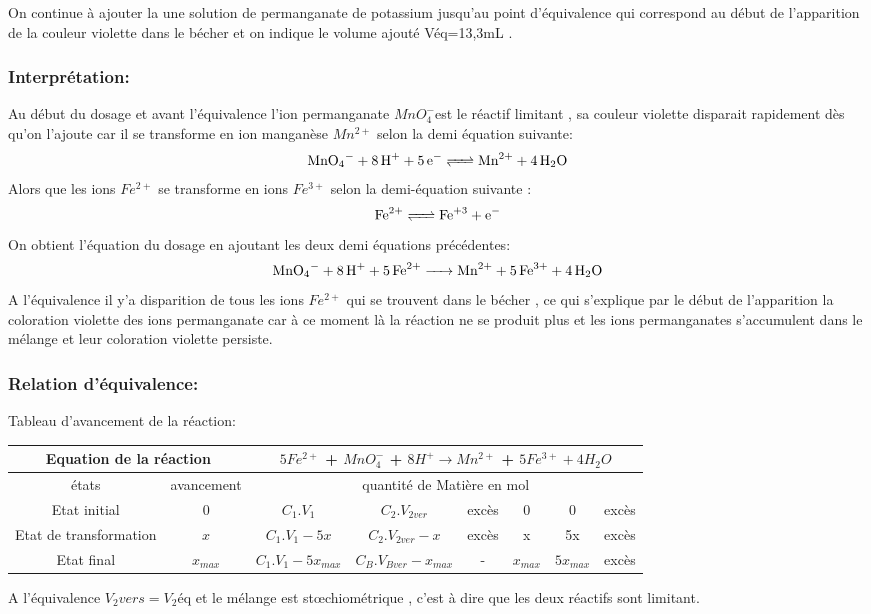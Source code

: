 \documentclass[12pt]{article}
\begin{document}
On continue à ajouter la une solution de permanganate de potassium jusqu'au point d'équivalence qui correspond au
début de l'apparition de la couleur violette dans le bécher et on indique le volume ajouté Véq=13,3mL .

\subsubsection{Interprétation:}
Au début du dosage et avant l'équivalence l'ion permanganate $MnO_4^-$est le réactif limitant , sa couleur violette
disparait rapidement dès qu'on l'ajoute car il se transforme en ion manganèse $Mn^{2+}$ selon la demi équation suivante:
$$\ce{MnO_4^- + 8H^+ + 5e^- <=> Mn^{2+} + 4H_2O}$$
Alors que les ions $Fe^{2+}$ se transforme en ions $Fe^{3+}$ selon la demi-équation suivante : $$\ce{Fe^{2+} <=> Fe^{+3} + e^-}$$
On obtient l'équation du dosage en ajoutant les deux demi équations précédentes:
$$\ce{MnO_4^- + 8H^+ + 5Fe^{2+} -> Mn^{2+} +5Fe^{3+} + 4H_2O}$$
A l'équivalence il y'a disparition de tous les ions $Fe^{2+}$ qui se trouvent dans le bécher , ce qui s'explique par le début de
l'apparition la coloration violette des ions permanganate car à ce moment là la réaction ne se produit plus et les ions
permanganates s'accumulent dans le mélange et leur coloration violette persiste.

\subsubsection{Relation d'équivalence:}

Tableau d'avancement de la réaction:

\begin{center}
\begin{tabular}{|c|c|c|c|c|c|c|c|}
    \hline
    \multicolumn{2}{|c|}{Equation de la réaction}&\multicolumn{6}{c|}{  $5Fe^{2+}$ +  $MnO_4^-$ +  $8H^+ \rightarrow Mn^{2+}$ + $5Fe^{3+} + 4H_2O$}\\\hline
    états  & avancement& \multicolumn{6}{|c|}{quantité de Matière en mol}\\\hline
    Etat initial          & 0 &$C_1.V_1$  &$C_2.V_{2ver}$ & excès & 0 &0& excès \\\hline
    Etat de transformation&$x$&$C_1.V_1-5x$&$C_2.V_{2ver}-x$& excès&x&5x&excès  \\\hline
    Etat final            &    $x_{max}$& $ C_1.V_1-5x_{max}$ & $ C_B.V_{Bver}-x_{max}$&-&$x_{max}$ &$5x_{max}$&excès \\\hline
\end{tabular}
\end{center}
A l'équivalence $V_2vers=V_2$éq et le mélange est stœchiométrique , c'est à dire que les deux réactifs sont limitant.
\end{document}
